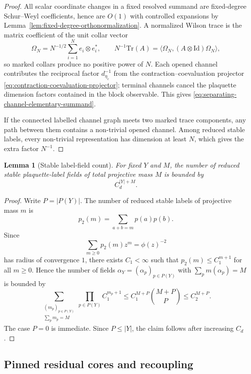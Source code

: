 \documentclass[11pt,a4paper,reqno]{amsart}
\newtheorem{lemma}[theorem]{Lemma}
\theoremstyle{definition}
\theoremstyle{remark}
\newcommand\Tr{{\mathrm{Tr}}}
\newcommand\Id{{\mathrm{Id}}}
\begin{document}
\begin{proof}
All scalar coordinate changes in a fixed resolved summand are fixed-degree Schur--Weyl coefficients, hence are $O(1)$ with controlled expansions by Lemma~\ref{lem:fixed-degree-orthonormalization}.  A normalized Wilson trace is the matrix coefficient of the unit collar vector
\[
\Omega_N=N^{-1/2}\sum_{i=1}^N e_i\otimes e_i^*,
\qquad
N^{-1}\Tr(A)=\langle\Omega_N,(A\otimes\Id)\Omega_N\rangle,
\]
so marked collars produce no positive power of $N$.  Each opened channel contributes the reciprocal factor $d_{\eta_c}^{-1}$ from the contraction--coevaluation projector \eqref{eq:contraction-coevaluation-projector}; terminal channels cancel the plaquette dimension factors contained in the block observable.  This gives \eqref{eq:separating-channel-elementary-summand}.

If the connected labelled channel graph meets two marked trace components, any path between them contains a non-trivial opened channel.  Among reduced stable labels, every non-trivial representation has dimension at least $N$, which gives the extra factor $N^{-1}$.
\end{proof}

\begin{lemma}[Stable label-field count]
\label{lem:local-complexity-bound}
For fixed $Y$ and $M$, the number of reduced stable plaquette-label fields of total projective mass $M$ is bounded by
\[
C_d^{|Y|+M}.
\]
\end{lemma}

\begin{proof}
Write $P=|P(Y)|$.  The number of reduced stable labels of projective mass $m$ is
\[
p_2(m)=\sum_{a+b=m}p(a)p(b).
\]
Since
\[
\sum_{m\ge0}p_2(m)z^m=\phi(z)^{-2}
\]
has radius of convergence $1$, there exists $C_1<\infty$ such that
$p_2(m)\le C_1^{m+1}$ for all $m\ge0$.  Hence the number of fields
$\alpha_Y=(\alpha_p)_{p\in P(Y)}$ with $\sum_pm(\alpha_p)=M$ is bounded by
\[
\sum_{\substack{(m_p)_{p\in P(Y)}\\ \sum_pm_p=M}}
\prod_{p\in P(Y)}C_1^{m_p+1}
\le
C_1^{M+P}\binom{M+P}{P}
\le C_2^{M+P}.
\]
The case $P=0$ is immediate.  Since $P\le |Y|$, the claim follows after increasing $C_d$.
\end{proof}

\subsection{Pinned residual cores and recoupling}\label{subsec:residual-core}
\end{document}
